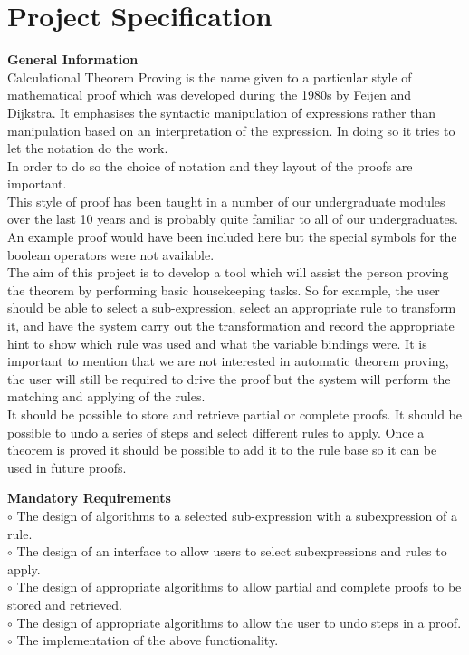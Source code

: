 \documentclass{article}
\newcommand{\enterProblemHeader}[1]{
\nobreak\extramarks{#1}{#1}\nobreak
\nobreak\extramarks{#1}{#1}\nobreak
}
\newcommand{\exitProblemHeader}[1]{
\nobreak\extramarks{#1}{#1 continued on next page\ldots}\nobreak
\nobreak\extramarks{#1}{}\nobreak
}
\newcounter{homeworkProblemCounter} %
\newcommand{\homeworkProblemName}{}
\newenvironment{homeworkProblem}[1][
 \arabic{homeworkProblemCounter}]{ %
\stepcounter{homeworkProblemCounter} %
\renewcommand{\homeworkProblemName}{#1} %
\section{\homeworkProblemName} %
\enterProblemHeader{} %
}{
\exitProblemHeader{} %
}
\begin{document}
\begin{homeworkProblem}[Project Specification]
\begin{description}

\item \textbf{General Information}\\
Calculational Theorem Proving is the name given to a particular style of mathematical proof which
was developed during the 1980s by Feijen and Dijkstra. It emphasises the syntactic manipulation
of expressions rather than manipulation based on an interpretation of the expression. In doing so it tries to let the notation do the work.\\

In order to do so the choice of notation and they layout of the proofs are important.\\

This style of proof has been taught in a number of our undergraduate modules over the last 10
years and is probably quite familiar to all of our undergraduates. An example proof would have
been included here but the special symbols for the boolean operators were not available.\\

The aim of this project is to develop a tool which will assist the person proving the theorem
by performing basic housekeeping tasks. So for example, the user should be able to select a
sub-expression, select an appropriate rule to transform it, and have the system carry out the
transformation and record the appropriate hint to show which rule was used and what the variable bindings were. It is important to mention that we are not interested in automatic theorem proving, the user will still be required to drive the proof but the system will perform the matching and applying of the rules.\\

It should be possible to store and retrieve partial or complete proofs. It should be possible to undo a series of steps and select different rules to apply. Once a theorem is proved it should be possible to add it to the rule base so it can be used in future proofs.

\item \textbf{Mandatory Requirements}\\
$\circ$ The design of algorithms to a selected sub-expression with a subexpression of a rule.\\
$\circ$ The design of an interface to allow users to select subexpressions and rules to apply.\\
$\circ$ The design of appropriate algorithms to allow partial and complete proofs to be stored and retrieved.\\
$\circ$ The design of appropriate algorithms to allow the user to undo steps in a proof.\\
$\circ$ The implementation of the above functionality.


\end{description}
\end{homeworkProblem}
\end{document}

